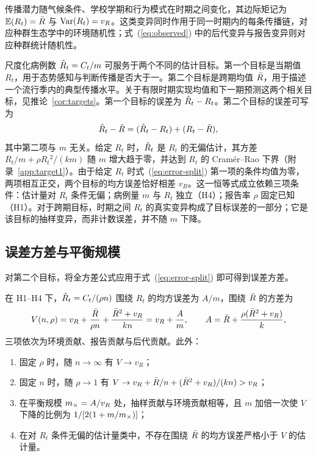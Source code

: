 传播潜力随气候条件、学校学期和行为模式在时期之间变化\citep{cauchemez2008estimating, shaman2009absolute, dalziel2018urbanization}，其边际矩记为 $\mathbb{E}(R_t)=\bar{R}$ 与 $\mathrm{Var}(R_t)=v_R$。这类变异同时作用于同一时期内的每条传播链，对应种群生态学中的环境随机性；式~(\ref{eq:observed}) 中的后代变异与报告变异则对应种群统计随机性\citep{engen1998demographic, lande2003stochastic}。

尺度化病例数 $\hat{R}_t=C_t/m$ 可服务于两个不同的估计目标。第一个目标是当期值 $R_t$，用于态势感知与判断传播是否大于一。第二个目标是跨期均值 $\bar{R}$，用于描述一个流行季内的典型传播水平。关于有限时期实现均值和下一期预测这两个相关目标，见推论~\ref{cor:targets}。第一个目标的误差为 $\hat{R}_t-R_t$。第二个目标的误差可写为
\begin{equation}
  \hat{R}_t-\bar{R}=(\hat{R}_t-R_t)+(R_t-\bar{R}),
  \label{eq:error-split}
\end{equation}
其中第二项与 $m$ 无关。给定 $R_t$ 时，$\hat{R}_t$ 是 $R_t$ 的无偏估计，其方差 $R_t/m+\rho R_t{}^2/(km)$ 随 $m$ 增大趋于零，并达到 $R_t$ 的 Cram\'er--Rao 下界（附录~\ref{app:target1}）。由于给定 $R_t$ 时式~(\ref{eq:error-split}) 第一项的条件均值为零，两项相互正交，两个目标的均方误差恰好相差 $v_R$。这一恒等式成立依赖三项条件：估计量对 $R_t$ 条件无偏；病例量 $m$ 与 $R_t$ 独立（H4）；报告率 $\rho$ 固定已知（H1）。对于跨期目标，时期之间 $R_t$ 的真实变异构成了目标误差的一部分；它是该目标的抽样变异，而非计数误差，并不随 $m$ 下降。

\subsection{误差方差与平衡规模}
\label{sec:bg-variance}

对第二个目标，将全方差公式应用于式~(\ref{eq:error-split}) 即可得到误差方差。

\begin{proposition}[跨期均值的误差方差]
\label{prop:average}
在 H1--H4 下，$\hat{R}_t=C_t/(\rho n)$ 围绕 $R_t$ 的均方误差为 $A/m$，围绕 $\bar{R}$ 的方差为
\begin{equation}
  V(n,\rho)=v_R+\frac{\bar{R}}{\rho n}+\frac{\bar{R}^2+v_R}{kn}=v_R+\frac{A}{m},
  \qquad A=\bar{R}+\frac{\rho(\bar{R}^2+v_R)}{k},
  \label{eq:var-average}
\end{equation}
三项依次为环境贡献、报告贡献与后代贡献。此外：
\begin{enumerate}[label=(\roman*),leftmargin=2em]
  \item 固定 $\rho$ 时，随 $n\to\infty$ 有 $V\to v_R$；
  \item 固定 $n$ 时，随 $\rho\to1$ 有 $V\to v_R+\bar{R}/n+(\bar{R}^2+v_R)/(kn)>v_R$；
  \item 在平衡规模 $m_{\times}=A/v_R$ 处，抽样贡献与环境贡献相等，且 $m$ 加倍一次使 $V$ 下降的比例为 $1/[2(1+m/m_{\times})]$；
  \item 在对 $R_t$ 条件无偏的估计量类中，不存在围绕 $\bar{R}$ 的均方误差严格小于 $V$ 的估计量。
\end{enumerate}
\end{proposition}

